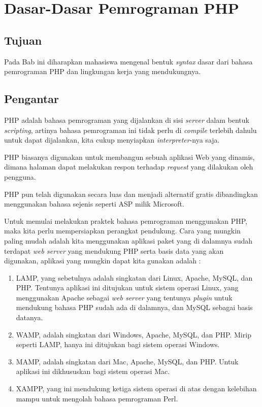 \chapter{Dasar-Dasar Pemrograman PHP}

\section{Tujuan}

Pada Bab ini diharapkan mahasiswa mengenal bentuk \textit{syntax} dasar dari bahasa pemrograman PHP dan lingkungan kerja yang mendukungnya.

\section{Pengantar}

PHP adalah bahasa pemrograman yang dijalankan di sisi \textit{server} dalam bentuk \textit{scripting}, artinya bahasa pemrograman ini tidak perlu di \textit{compile} terlebih dahulu untuk dapat dijalankan, kita cukup menyiapkan \textit{interpreter}-nya saja.

PHP biasanya digunakan untuk membangun sebuah aplikasi Web yang dinamis, dimana halaman dapat melakukan respon terhadap \textit{request} yang dilakukan oleh pengguna. 

PHP pun telah digunakan secara luas dan menjadi alternatif gratis dibandingkan menggunakan bahasa sejenis seperti ASP milik Microsoft.

Untuk memulai melakukan praktek bahasa pemrograman menggunakan PHP, maka kita perlu mempersiapkan perangkat pendukung. Cara yang mungkin paling mudah adalah kita menggunakan aplikasi paket yang di dalamnya sudah terdapat \textit{web server} yang mendukung PHP serta basis data yang akan digunakan, aplikasi yang mungkin dapat kita gunakan adalah :

\begin{enumerate}
	\item LAMP, yang sebetulnya adalah singkatan dari Linux, Apache, MySQL, dan PHP. Tentunya aplikasi ini ditujukan untuk sistem operasi Linux, yang menggunakan Apache sebagai \textit{web server} yang tentunya \textit{plugin} untuk mendukung bahasa PHP sudah ada di dalamnya, dan MySQL sebagai basis datanya.
	\item WAMP, adalah singkatan dari Windows, Apache, MySQL, dan PHP. Mirip seperti LAMP, hanya ini ditujukan bagi sistem operasi Windows.
	\item MAMP, adalah singkatan dari Mac, Apache, MySQL, dan PHP. Untuk aplikasi ini dikhususkan bagi sistem operasi Mac.
	\item XAMPP, yang ini mendukung ketiga sistem operasi di atas dengan kelebihan mampu untuk mengolah bahasa pemrograman Perl.
\end{enumerate}

